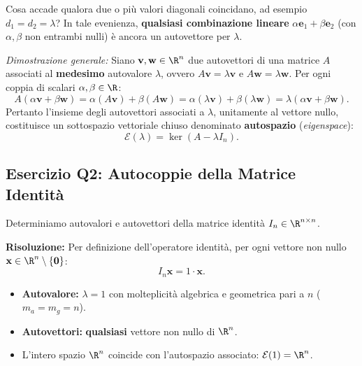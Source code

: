 \begin{property}
Cosa accade qualora due o pi\`u valori diagonali coincidano, ad esempio $d_1 = d_2 = \lambda$?
In tale evenienza, \textbf{qualsiasi combinazione lineare} $\alpha \mathbf{e}_1 + \beta \mathbf{e}_2$ (con $\alpha, \beta$ non entrambi nulli) \`e ancora un autovettore per $\lambda$.

\medskip
\noindent\textit{Dimostrazione generale:} Siano $\mathbf{v}, \mathbf{w} \in \R^n$ due autovettori di una matrice $A$ associati al \textbf{medesimo} autovalore $\lambda$, ovvero $A\mathbf{v} = \lambda \mathbf{v}$ e $A\mathbf{w} = \lambda \mathbf{w}$. Per ogni coppia di scalari $\alpha, \beta \in \R$:
\begin{equation}
    A(\alpha \mathbf{v} + \beta \mathbf{w}) = \alpha (A\mathbf{v}) + \beta (A\mathbf{w}) = \alpha (\lambda \mathbf{v}) + \beta (\lambda \mathbf{w}) = \lambda (\alpha \mathbf{v} + \beta \mathbf{w}).
\end{equation}
Pertanto l'insieme degli autovettori associati a $\lambda$, unitamente al vettore nullo, costituisce un sottospazio vettoriale chiuso denominato \textbf{autospazio} (\textit{eigenspace}):
\begin{equation}
    \mathcal{E}(\lambda) = \ker(A - \lambda I_n).
\end{equation}
\end{property}

\subsection{Esercizio Q2: Autocoppie della Matrice Identit\`a}

\begin{example}
\label{ex:q2-matrice-identita}
Determiniamo autovalori e autovettori della matrice identit\`a $I_n \in \R^{n \times n}$.

\noindent\textbf{Risoluzione:}
Per definizione dell'operatore identit\`a, per ogni vettore non nullo $\mathbf{x} \in \R^n \setminus \{\mathbf{0}\}$:
\begin{equation}
    I_n \mathbf{x} = 1 \cdot \mathbf{x}.
\end{equation}
\begin{itemize}
    \item \textbf{Autovalore:} $\lambda = 1$ con molteplicit\`a algebrica e geometrica pari a $n$ ($m_a = m_g = n$).
    \item \textbf{Autovettori:} \textbf{qualsiasi} vettore non nullo di $\R^n$.
    \item L'intero spazio $\R^n$ coincide con l'autospazio associato: $\mathcal{E}(1) = \R^n$.
\end{itemize}
\end{example}

